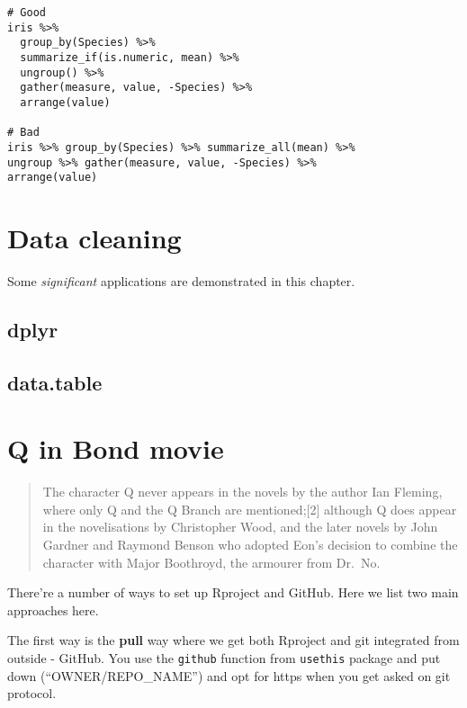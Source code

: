 \documentclass[]{book}
\begin{document}
\begin{verbatim}
# Good
iris %>%
  group_by(Species) %>%
  summarize_if(is.numeric, mean) %>%
  ungroup() %>%
  gather(measure, value, -Species) %>%
  arrange(value)

# Bad
iris %>% group_by(Species) %>% summarize_all(mean) %>%
ungroup %>% gather(measure, value, -Species) %>%
arrange(value)
\end{verbatim}

\hypertarget{data-cleaning}{%
\chapter{Data cleaning}\label{data-cleaning}}

Some \emph{significant} applications are demonstrated in this chapter.

\hypertarget{dplyr}{%
\section{dplyr}\label{dplyr}}

\hypertarget{data.table}{%
\section{data.table}\label{data.table}}

\hypertarget{q-in-bond-movie}{%
\chapter{Q in Bond movie}\label{q-in-bond-movie}}

\begin{quote}
The character Q never appears in the novels by the author Ian Fleming, where only Q and the Q Branch are mentioned;{[}2{]} although Q does appear in the novelisations by Christopher Wood, and the later novels by John Gardner and Raymond Benson who adopted Eon's decision to combine the character with Major Boothroyd, the armourer from Dr.~No.
\end{quote}

There're a number of ways to set up Rproject and GitHub. Here we list two main approaches here.

The first way is the \textbf{pull} way where we get both Rproject and git integrated from outside - GitHub. You use the \texttt{github} function from \texttt{usethis} package and put down (``OWNER/REPO\_NAME'') and opt for https when you get asked on git protocol.
\end{document}
